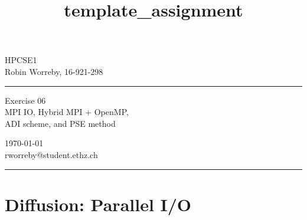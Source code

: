 \documentclass[a4paper,10pt]{article} %
\begin{document}

\title{template_assignment} %
\fancyhead[C]{}
\begin{minipage}{0.295\textwidth} %
\raggedright
HPCSE1\\ %
\footnotesize %
Robin Worreby, 16-921-298 %
\medskip\hrule
\end{minipage}
\begin{minipage}{0.4\textwidth} %
\centering 
\large %
Exercise 06\\ %
\normalsize %
MPI IO, Hybrid MPI + OpenMP,\\
ADI scheme, and PSE method %
\end{minipage}
\begin{minipage}{0.295\textwidth} %
\raggedleft
\today\\ %
\footnotesize %
rworreby@student.ethz.ch%
\medskip\hrule
\end{minipage}


\setcounter{section}{0}

\section{Diffusion: Parallel I/O}
\end{document}
